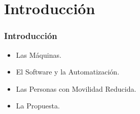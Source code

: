 \section{Introducci\'on}

\begin{frame}
\frametitle{Introducci\'on}
\begin{itemize}
\item {Las M\'aquinas.}
\item {El Software y la Automatizaci\'on.}
\item {Las Personas con Movilidad Reducida.}
\item {La Propuesta.}
\end{itemize} 


\end{frame}


